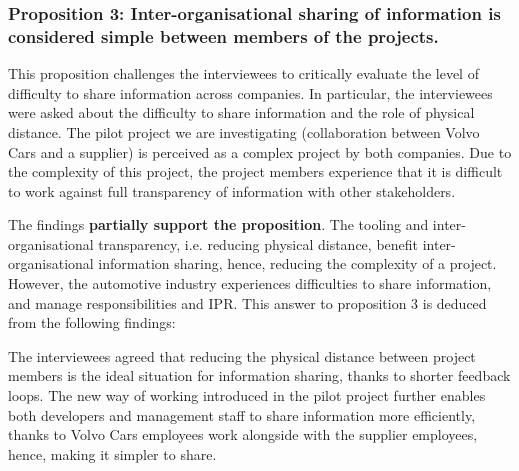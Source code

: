 %


\vspace{.2cm}
\subsubsection{Proposition 3: Inter-organisational sharing of information is considered simple between members of the projects.}

This proposition challenges the interviewees to critically evaluate the level of difficulty to share information across companies. In particular, the interviewees were asked about the difficulty to share information and the role of physical distance. The pilot project we are investigating (collaboration between Volvo Cars and a supplier) is perceived as a complex project by both companies. Due to the complexity of this project, the project members experience that it is difficult to work against full transparency of information with other stakeholders. 

The findings {\bf partially support the proposition}. The tooling and inter-organisational transparency, i.e. reducing physical distance, benefit inter-organisational information sharing, hence, reducing the complexity of a project. However, the automotive industry experiences difficulties to share information, and manage responsibilities and IPR. This answer to proposition 3 is deduced from the following findings:

 The interviewees agreed that reducing the physical distance between project members is the ideal situation for information sharing, thanks to shorter feedback loops. The new way of working introduced in the pilot project further enables both developers and management staff to share information more efficiently, thanks to Volvo Cars employees work alongside with the supplier employees, hence, making it simpler to share. 


